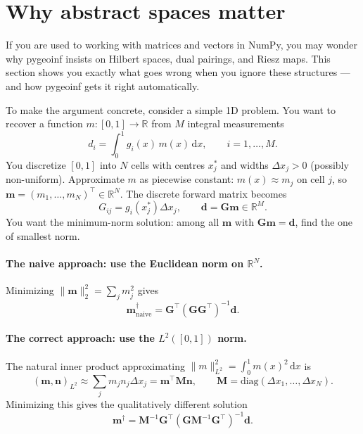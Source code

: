 \documentclass[11pt,twoside,openright]{book}
\theoremstyle{plain}
\theoremstyle{definition}
\theoremstyle{remark}
\begin{document}
\section{Why abstract spaces matter}
\label{sec:why-spaces-matter}

\begin{whybox}
If you are used to working with matrices and vectors in NumPy, you may
wonder why pygeoinf insists on Hilbert spaces, dual pairings, and Riesz
maps. This section shows you exactly what goes wrong when you ignore
these structures --- and how pygeoinf gets it right automatically.
\end{whybox}

To make the argument concrete, consider a simple 1D problem. You want to
recover a function $m : [0,1] \to \mathbb{R}$ from $M$ integral
measurements
\begin{equation}
  \label{eq:motivating-forward}
  d_i = \int_0^1 g_i(x)\, m(x)\, \mathrm{d}x, \qquad i = 1,\ldots,M.
\end{equation}
You discretize $[0,1]$ into $N$ cells with centres $x_j^*$ and widths
$\Delta x_j > 0$ (possibly non-uniform). Approximate $m$ as piecewise
constant: $m(x) \approx m_j$ on cell $j$, so $\mathbf{m} =
(m_1,\ldots,m_N)^\top \in \mathbb{R}^N$. The discrete forward matrix
becomes
\begin{equation}
  \label{eq:motivating-matrix}
  G_{ij} = g_i(x_j^*) \Delta x_j,
  \qquad \mathbf{d} = \mathbf{G}\mathbf{m} \in \mathbb{R}^M.
\end{equation}
You want the minimum-norm solution: among all $\mathbf{m}$ with
$\mathbf{G}\mathbf{m} = \mathbf{d}$, find the one of smallest
norm.

\paragraph{The naive approach: use the Euclidean norm on $\mathbb{R}^N$.}
Minimizing $\|\mathbf{m}\|_2^2 = \sum_j m_j^2$ gives
\begin{equation}
  \label{eq:naive-min-norm}
  \mathbf{m}^\dagger_{\text{naive}}
  = \mathbf{G}^\top (\mathbf{G}\mathbf{G}^\top)^{-1} \mathbf{d}.
\end{equation}

\paragraph{The correct approach: use the $L^2([0,1])$ norm.}
The natural inner product approximating $\|m\|_{L^2}^2 = \int_0^1 m(x)^2
\,\mathrm{d}x$ is
\begin{equation}
  \label{eq:L2-inner-product}
  (\mathbf{m},\mathbf{n})_{L^2} \approx \sum_j m_j n_j \Delta x_j
  = \mathbf{m}^\top \mathbf{M} \mathbf{n},
  \qquad \mathbf{M} = \mathrm{diag}(\Delta x_1,\ldots,\Delta x_N).
\end{equation}
Minimizing this gives the qualitatively different solution
\begin{equation}
  \label{eq:correct-min-norm}
  \mathbf{m}^\dagger
  = \mathbf{M}^{-1}\mathbf{G}^\top
    (\mathbf{G}\mathbf{M}^{-1}\mathbf{G}^\top)^{-1} \mathbf{d}.
\end{equation}
\end{document}
